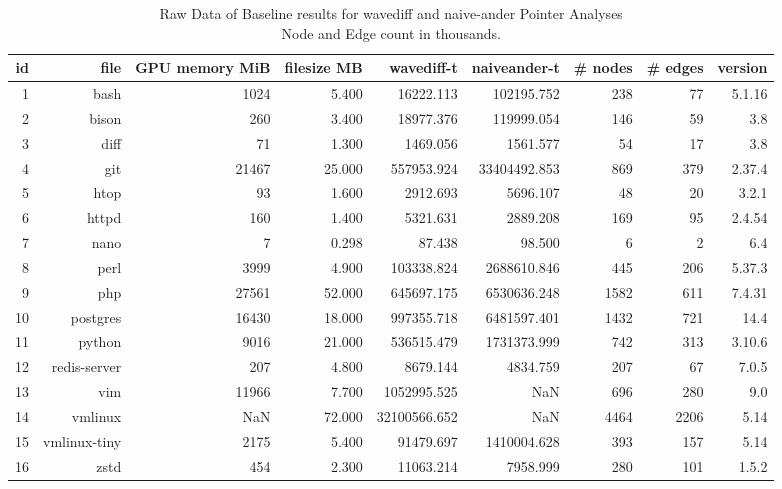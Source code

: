 \begin{table}[ht]
    \tiny
    \begin{tabular}{rrrrrrrrr}
        \toprule
        id & file         & GPU memory MiB & filesize MB & wavediff-t   & naiveander-t & \# nodes & \# edges & version \\
        \midrule
        1  & bash         & 1024           & 5.400       & 16222.113    & 102195.752   & 238      & 77       & 5.1.16  \\
        2  & bison        & 260            & 3.400       & 18977.376    & 119999.054   & 146      & 59       & 3.8     \\
        3  & diff         & 71             & 1.300       & 1469.056     & 1561.577     & 54       & 17       & 3.8     \\
        4  & git          & 21467          & 25.000      & 557953.924   & 33404492.853 & 869      & 379      & 2.37.4  \\
        5  & htop         & 93             & 1.600       & 2912.693     & 5696.107     & 48       & 20       & 3.2.1   \\
        6  & httpd        & 160            & 1.400       & 5321.631     & 2889.208     & 169      & 95       & 2.4.54  \\
        7  & nano         & 7              & 0.298       & 87.438       & 98.500       & 6        & 2        & 6.4     \\
        8  & perl         & 3999           & 4.900       & 103338.824   & 2688610.846  & 445      & 206      & 5.37.3  \\
        9  & php          & 27561          & 52.000      & 645697.175   & 6530636.248  & 1582     & 611      & 7.4.31  \\
        10 & postgres     & 16430          & 18.000      & 997355.718   & 6481597.401  & 1432     & 721      & 14.4    \\
        11 & python       & 9016           & 21.000      & 536515.479   & 1731373.999  & 742      & 313      & 3.10.6  \\
        12 & redis-server & 207            & 4.800       & 8679.144     & 4834.759     & 207      & 67       & 7.0.5   \\
        13 & vim          & 11966          & 7.700       & 1052995.525  & NaN          & 696      & 280      & 9.0     \\
        14 & vmlinux      & NaN            & 72.000      & 32100566.652 & NaN          & 4464     & 2206     & 5.14    \\
        15 & vmlinux-tiny & 2175           & 5.400       & 91479.697    & 1410004.628  & 393      & 157      & 5.14    \\
        16 & zstd         & 454            & 2.300       & 11063.214    & 7958.999     & 280      & 101      & 1.5.2   \\
        \bottomrule
    \end{tabular}

    \caption[Raw Data of Baseline results for wavediff and naive-ander Pointer Analyses]{Raw Data of Baseline results for wavediff and naive-ander Pointer Analyses\\Node and Edge count in thousands.}
\end{table}

